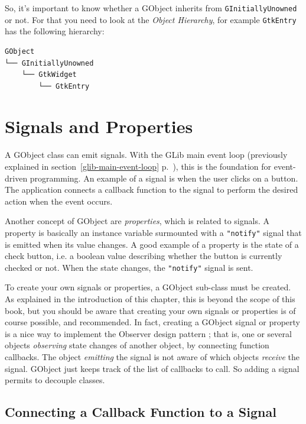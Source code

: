 So, it's important to know whether a GObject inherits from \lstinline{GInitiallyUnowned} or not. For that you need to look at the \emph{Object Hierarchy}, for example \lstinline{GtkEntry} has the following hierarchy:

\begin{verbatim}
GObject
└── GInitiallyUnowned
    └── GtkWidget
        └── GtkEntry
\end{verbatim}

\section{Signals and Properties}
\label{oop-gobject-signals-and-properties}

A GObject class can emit signals. With the GLib main event loop (previously explained in section~\ref{glib-main-event-loop} p.~\pageref{glib-main-event-loop}), this is the foundation for event-driven programming. An example of a signal is when the user clicks on a button. The application connects a callback function to the signal to perform the desired action when the event occurs.

Another concept of GObject are \emph{properties}, which is related to signals. A property is basically an instance variable surmounted with a \lstinline{"notify"} signal that is emitted when its value changes. A good example of a property is the state of a check button, i.e. a boolean value describing whether the button is currently checked or not. When the state changes, the \lstinline{"notify"} signal is sent.

To create your own signals or properties, a GObject sub-class must be created. As explained in the introduction of this chapter, this is beyond the scope of this book, but you should be aware that creating your own signals or properties is of course possible, and recommended. In fact, creating a GObject signal or property is a nice way to implement the Observer design pattern \cite{design-patterns-book}; that is, one or several objects \emph{observing} state changes of another object, by connecting function callbacks. The object \emph{emitting} the signal is not aware of which objects \emph{receive} the signal. GObject just keeps track of the list of callbacks to call. So adding a signal permits to decouple classes.

\subsection{Connecting a Callback Function to a Signal}

